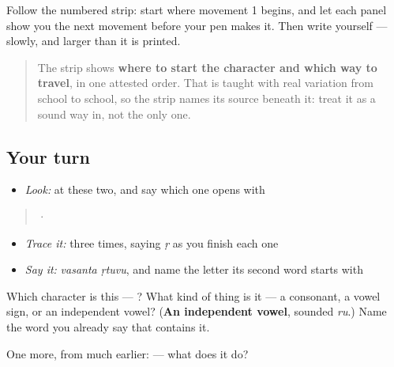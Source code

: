 Follow the numbered strip: start where movement 1 begins, and let each panel show you the next movement before your pen makes it. Then write  yourself — slowly, and larger than it is printed.

\begin{quote}
The strip shows \textbf{where to start the character and which way to travel}, in one attested order. That is taught with real variation from school to school, so the strip names its source beneath it: treat it as a sound way in, not the only one.
\end{quote}

\subsection*{Your turn}
\begin{itemize}
\raggedright
  \item \emph{Look:} at these two, and say which one opens with 
\end{itemize}

\begin{quote}
  ·  
\end{quote}

\begin{itemize}
\raggedright
  \item \emph{Trace it:}  three times, saying \emph{ṛ} as you finish each one
  \item \emph{Say it:} \emph{vasanta ṛtuvu}, and name the letter its second word starts with
\end{itemize}

\begin{tcolorbox}[breakable,colback=teal!4,colframe=teal!35!black,title={Before you move on}]
Which character is this — ? What kind of thing is it — a consonant, a vowel sign, or an independent vowel? (\textbf{An independent vowel}, sounded \emph{ru}.) Name the word you already say that contains it.

One more, from much earlier:  — what does it do?
\end{tcolorbox}
